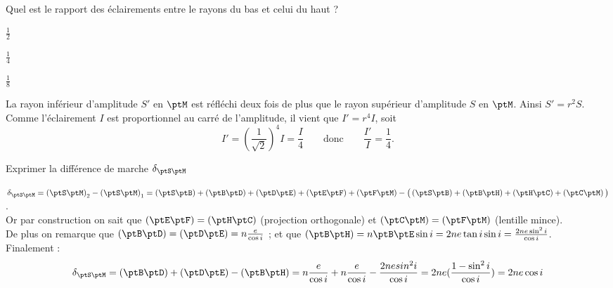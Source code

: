 \begin{enonce}
	Quel est le rapport des éclairements entre le rayons du bas et celui du haut ? 
	
	\begin{listeQCM3Colonnes}
	\item $\frac{1}{2}$
	\item $\frac{1}{4}$
	\item $\frac{1}{8}$
	\end{listeQCM3Colonnes}
\end{enonce}

\reponse{\reponseB{}}

\begin{corrige}
	La rayon inférieur d'amplitude $S'$ en $\ptM$ est réfléchi deux fois de plus que le rayon supérieur d'amplitude $S$ en $\ptM$. Ainsi $S' = r^2 S$. Comme l'éclairement $I$ est proportionnel au carré de l'amplitude, il vient que $I' = r^4 I$, soit
	$$
	I' = \left( \frac{1}{\sqrt{2}} \right)^4 I = \frac{I}{4} \qquad \text{donc} \qquad \frac{I'}{I} = \frac{1}{4}.$$
	
\end{corrige}




\begin{enonce}
Exprimer la différence de marche $\delta_{\ptS\ptM}$
\end{enonce}


\begin{corrige}
$\delta_{\ptS\ptM}=\left(\ptS\ptM\right)_2 - \left(\ptS\ptM\right)_1 = \left(\ptS\ptB\right)+\left(\ptB\ptD\right)+\left(\ptD\ptE\right)+\left(\ptE\ptF\right) + \left(\ptF\ptM\right) - \big( \left(\ptS\ptB\right) + \left(\ptB\ptH\right) + \left(\ptH\ptC\right) + \left(\ptC\ptM\right) \big)$.\\
Or par construction on sait que $\left(\ptE\ptF\right)=\left(\ptH\ptC\right)$ (projection orthogonale) et $\left(\ptC\ptM\right)=\left(\ptF\ptM\right)$ (lentille mince).\\
De plus on remarque que $\left(\ptB\ptD\right)= \left(\ptD\ptE\right) = n\frac{e}{\cos i}$ ; et que $\left(\ptB\ptH\right) = n\ptB\ptE\sin i = 2n e \tan i \sin i = \frac{2ne \sin^2 i}{\cos i}$.\\
Finalement :
\begin{equation*}
	\delta_{\ptS\ptM}= \left(\ptB\ptD\right)+\left(\ptD\ptE\right) - \left(\ptB\ptH\right) = n\frac{e}{\cos i} + n\frac{e}{\cos i} - \frac{2ne sin^2 i}{\cos i} = 2ne (\frac{1-\sin^2 i}{\cos i} ) = 2ne \cos i
\end{equation*} 
\end{corrige}

